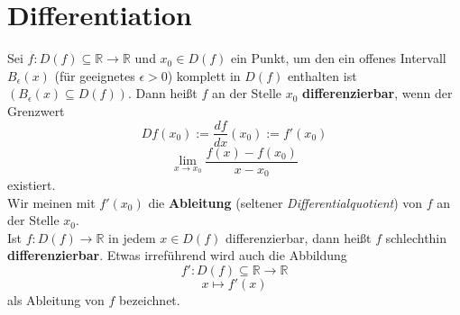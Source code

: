 \section{Differentiation}

\begin{Definition}{
	Sei $f: D \left( f \right) \subseteq \mathbb{R} \rightarrow \mathbb{R}$ 
	und $x_0 \in D \left( f \right)$ ein Punkt, 
	um den ein offenes Intervall $B_{\epsilon} \left( x \right)$ 
	(für geeignetes $\epsilon > 0$) komplett 
	in $D \left( f \right)$ enthalten ist $\left( B_{\epsilon} \left( x \right)
	 \subseteq D \left( f \right) \right) $. Dann heißt $f$ an der Stelle $x_0$ 
	 \textbf{differenzierbar}, wenn der Grenzwert
	\begin{equation*}
		Df\left(x_0\right) := \frac{df}{dx} 
		\left( x_0 \right) := f'\left( x_0 \right) 
	\end{equation*}
	\begin{equation*}
	\lim\limits_{x \rightarrow x_0}{\frac{f 
	\left( x \right) - f \left( x_0 \right) }{x - x_0} }
	\end{equation*} 
	existiert. \\
	Wir meinen mit $f'\left(x_0\right)$ die \textbf{Ableitung} 
	(seltener \textit{Differentialquotient}) von $f$ an der Stelle $x_0$. \\
	Ist $f: D\left(f \right) \rightarrow \mathbb{R}$ in jedem $x \in D\left(f\right)
	$ differenzierbar, dann heißt $f$ schlechthin \textbf{differenzierbar}. 
	Etwas irreführend wird auch die Abbildung  
	\begin{equation*}
		f': D\left(f\right) \subseteq \mathbb{R} \rightarrow \mathbb{R}
	\end{equation*}
	\begin{equation*}
		x \mapsto f'(x)
	\end{equation*}
	als Ableitung von $f$ bezeichnet.
}\end{Definition}

